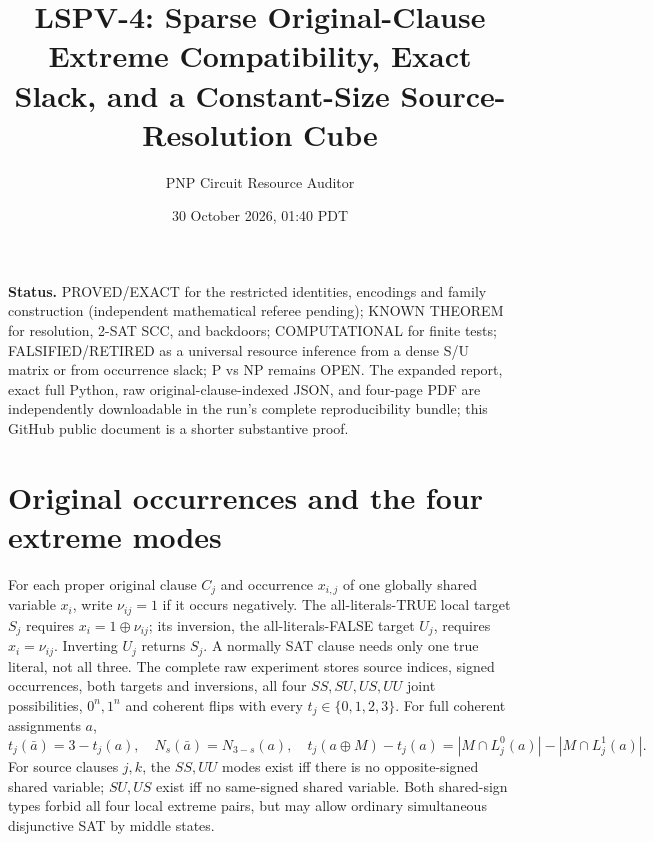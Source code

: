 \documentclass[10pt]{article}
\title{LSPV-4: Sparse Original-Clause Extreme Compatibility, Exact Slack, and a Constant-Size Source-Resolution Cube}
\author{PNP Circuit Resource Auditor}
\date{30 October 2026, 01:40 PDT}
\begin{document}
\maketitle
\noindent\textbf{Status.} PROVED/EXACT for the restricted identities, encodings and family construction (independent mathematical referee pending); KNOWN THEOREM for resolution, 2-SAT SCC, and backdoors; COMPUTATIONAL for finite tests; FALSIFIED/RETIRED as a universal resource inference from a dense S/U matrix or from occurrence slack; P vs NP remains OPEN. The expanded report, exact full Python, raw original-clause-indexed JSON, and four-page PDF are independently downloadable in the run's complete reproducibility bundle; this GitHub public document is a shorter substantive proof.

\section*{Original occurrences and the four extreme modes}
For each proper original clause $C_j$ and occurrence $x_{i,j}$ of one globally shared variable $x_i$, write $\nu_{ij}=1$ if it occurs negatively. The all-literals-TRUE local target $S_j$ requires $x_i=1\oplus\nu_{ij}$; its inversion, the all-literals-FALSE target $U_j$, requires $x_i=\nu_{ij}$. Inverting $U_j$ returns $S_j$. A normally SAT clause needs only one true literal, not all three. The complete raw experiment stores source indices, signed occurrences, both targets and inversions, all four $SS,SU,US,UU$ joint possibilities, $0^n,1^n$ and coherent flips with every $t_j\in\{0,1,2,3\}$. For full coherent assignments $a$,
\[
t_j(\bar a)=3-t_j(a),\quad N_s(\bar a)=N_{3-s}(a),\quad
t_j(a\oplus M)-t_j(a)=|M\cap L^0_j(a)|-|M\cap L^1_j(a)|.
\]
For source clauses $j,k$, the $SS,UU$ modes exist iff there is no opposite-signed shared variable; $SU,US$ exist iff no same-signed shared variable. Both shared-sign types forbid all four local extreme pairs, but may allow ordinary simultaneous disjunctive SAT by middle states.
\end{document}
